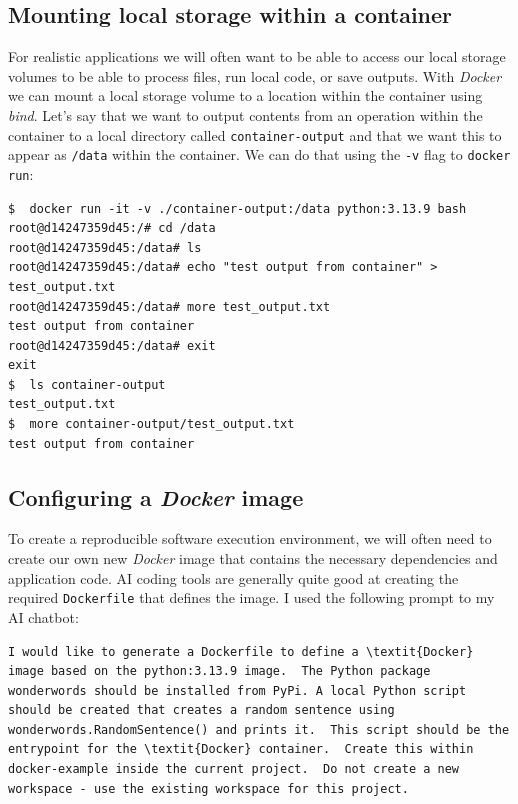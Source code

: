 \subsection{Mounting local storage within a container}

For realistic applications we will often want to be able to access our local storage volumes to be able to process files, run local code, or save outputs. With \textit{Docker} we can mount a local storage volume to a location within the container using \textit{bind}.  Let's say that we want to output contents from an operation within the container to a local directory called \texttt{container-output} and that we want this to appear as \texttt{/data} within the container.  We can do that using the \texttt{-v} flag to \texttt{docker run}:

\begin{lstlisting}[style=shell]
$  docker run -it -v ./container-output:/data python:3.13.9 bash
root@d14247359d45:/# cd /data
root@d14247359d45:/data# ls
root@d14247359d45:/data# echo "test output from container" > test_output.txt
root@d14247359d45:/data# more test_output.txt
test output from container
root@d14247359d45:/data# exit
exit
$  ls container-output
test_output.txt
$  more container-output/test_output.txt                                    
test output from container
\end{lstlisting}

\subsection{Configuring a \textit{Docker} image}

To create a reproducible software execution environment, we will often need to create our own new \textit{Docker} image that contains the necessary dependencies and application code.  AI coding tools are generally quite good at creating the required \texttt{Dockerfile} that defines the image. I used the following prompt to my AI chatbot:

\begin{lstlisting}[style=transcript]
I would like to generate a Dockerfile to define a \textit{Docker} image based on the python:3.13.9 image.  The Python package wonderwords should be installed from PyPi. A local Python script should be created that creates a random sentence using wonderwords.RandomSentence() and prints it.  This script should be the entrypoint for the \textit{Docker} container.  Create this within docker-example inside the current project.  Do not create a new workspace - use the existing workspace for this project.
\end{lstlisting}


